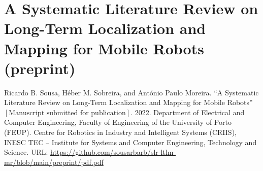 \chapter{A Systematic Literature Review on Long-Term Localization and Mapping for Mobile Robots (preprint)} \label{ap:slr}

Ricardo B. Sousa, H\'{e}ber M. Sobreira, and Ant\'{o}nio Paulo Moreira. ``A Systematic Literature Review on Long-Term Localization and Mapping for Mobile Robots'' $\left[\text{Manuscript submitted for publication}\right]$. 2022. Department of Electrical and Computer Engineering, Faculty of Engineering of the University of Porto (FEUP). Centre for Robotics in Industry and Intelligent Systems (CRIIS), INESC TEC -- Institute for Systems and Computer Engineering, Technology and Science. URL: \url{https://github.com/sousarbarb/slr-ltlm-mr/blob/main/preprint/pdf.pdf}

%
%
